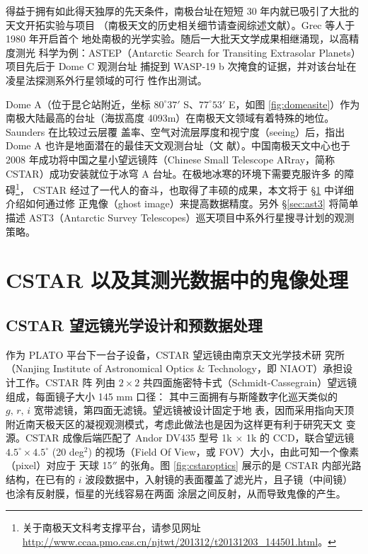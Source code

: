 得益于拥有如此得天独厚的先天条件，南极台址在短短 30 年内就已吸引了大批的天文开拓实验与项目
（南极天文的历史相关细节请查阅综述文献）。Grec 等人于 1980 年开启首个
地处南极的光学实验\cite{Grec1980}。随后一大批天文学成果相继涌现\cite{Burton2010}，以高精度测光
科学为例：ASTEP（Antarctic Search for Transiting Extrasolar Planets）项目先后于 Dome C 观测台址
捕捉到 WASP-19 b 次掩食的证据\cite{Abe2013STEP}，并对该台址在凌星法探测系外行星领域的可行
性作出测试\cite{Crouzet2010}。

Dome A（位于昆仑站附近，坐标 $80^{\circ}37'$ S、$77^{\circ}53'$ E，如图 \ref{fig:domeasite}）作为
南极大陆最高的台址（海拔高度 4093m）在南极天文领域有着特殊的地位。Saunders 在比较过云层覆
盖率、空气对流层厚度和视宁度（seeing）后，指出 Dome A 也许是地面潜在的最佳天文观测台址（文
献）。中国南极天文中心也于 2008 年成功将中国之星小望远镜阵（Chinese 
Small Telescope ARray，简称 CSTAR）成功安装就位于冰穹 A 台址。在极地冰寒的环境下需要克服许多
的障碍\footnote{关于南极天文科考支撑平台，请参见网址 \url{http://www.ccaa.pmo.cas.cn/njtwt/201312/t20131203_144501.html}。}，
CSTAR 经过了一代人的奋斗，也取得了丰硕的成果，本文将于 \S \ref{sec:cstar} 中详细介绍如何通过修
正鬼像（ghost image）来提高数据精度。另外 \S \ref{sec:ast3} 将简单描述 AST3（Antarctic Survey 
Telescopes）巡天项目中系外行星搜寻计划的观测策略。


\section{CSTAR 以及其测光数据中的鬼像处理}  \label{sec:cstar}
\subsection{CSTAR 望远镜光学设计和预数据处理}  \label{sec:cstardesign}
作为 PLATO 平台\cite{Lawrence2009,Yang2009}下一台子设备，CSTAR 望远镜由南京天文光学技术研
究所（Nanjing Institute of Astronomical Optics \& Technology，即 NIAOT）承担设计工作。CSTAR 阵
列由 $2\times2$ 共四面施密特卡式（Schmidt-Cassegrain）望远镜组成，每面镜子大小 145 mm 口径：
其中三面拥有与斯隆数字化巡天类似的 $g,\,r,\,i$  宽带滤镜，第四面无滤镜。望远镜被设计固定于地
表，因而采用指向天顶附近南天极天区的凝视观测模式，考虑此做法也是因为这样更有利于研究天文
变源。CSTAR 成像后端匹配了 Andor DV435 型号 1k $\times$ 1k 的 CCD，联合望远镜 $4.5^\circ{} 
\times 4.5^\circ{}$ (20 deg$^2$) 的视场（Field Of View，或 FOV）大小，由此可知一个像素（pixel）对应于
天球 15$''$ 的张角\cite{Yuan2008}。图 \ref{fig:cstaroptics} 展示的是 CSTAR 内部光路结构，在已有的 
$i$ 波段数据中，入射镜的表面覆盖了滤光片，且子镜（中间镜）也涂有反射膜，恒星的光线容易在两面
涂层之间反射，从而导致鬼像的产生。

